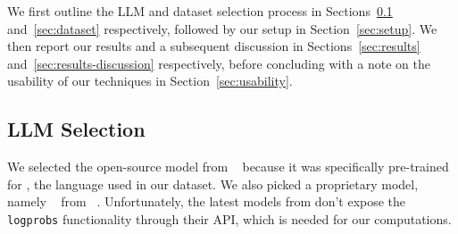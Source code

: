 
We first outline the LLM and dataset selection process in Sections~\ref{sec:techchallenge} and~\ref{sec:dataset} respectively, followed by our setup in Section~\ref{sec:setup}.
We then report our results and a subsequent discussion in Sections~\ref{sec:results} and~\ref{sec:results-discussion} respectively, before concluding with a note on the usability of our techniques in Section~\ref{sec:usability}.

\subsection{LLM Selection}
\label{sec:techchallenge}



We selected the open-source model \codegenmonoC from \salesforce~\cite{salesforcecodegen} because it was specifically pre-trained for \python, the language used in our dataset.
%
%
%
We also picked a proprietary model, namely \gptturbo~\cite{gpt35turboinstruct} from \openai~\cite{openai}.
            Unfortunately, the latest models from \openai don't expose the \texttt{logprobs} functionality through their API, which is needed for our computations. 

